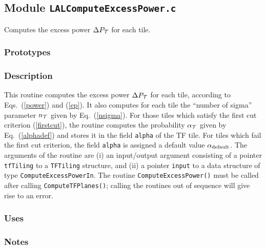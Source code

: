 \vfill{\footnotesize}

\newpage
\subsection{Module \texttt{LALComputeExcessPower.c}}
\label{ss:LALComputeExcessPower.c}

Computes the excess power $\Delta P_{\cal T}$ for each tile.

\subsubsection*{Prototypes}
\vspace{0.1in}


\subsubsection*{Description}

This routine computes the excess power $\Delta
P_{\cal T}$ for each tile, according to Eqs.\ (\ref{power}) and (\ref{ep}).
It also computes for each tile the ``number of sigma'' parameter $n_{\cal T}$
given by Eq.\ (\ref{nsigma}).  For those tiles which satisfy the first cut
criterion (\ref{firstcut}), the routine computes the probability $\alpha_{\cal
T}$ given by Eq.\ (\ref{alphadef}) and stores it in the field \verb+alpha+ of
the TF tile.  For tiles which fail the first cut criterion, the field
\verb+alpha+ is assigned a default value $\alpha_{\rm default}$.  The
arguments of the routine are (i) an input/output argument consisting of a
pointer \verb+tfTiling+ to a \verb+TFTiling+ structure, and (ii) a pointer
\verb+input+ to a data structure of type \verb+ComputeExcessPowerIn+.  The
routine \verb+ComputeExcessPower()+ must be called after calling
\verb+ComputeTFPlanes()+; calling the routines out of sequence will give rise
to an error.

\subsubsection*{Uses}

\subsubsection*{Notes}

